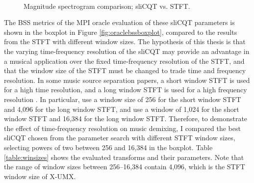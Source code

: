\documentclass[report.tex]{subfiles}
\begin{document}
\begin{figure}[ht]
	\centering
	\\
	\caption{Magnitude spectrogram comparison; sliCQT vs. STFT.}
	\label{fig:bipolarslicqs}
\end{figure}

The BSS metrics of the MPI oracle evaluation of these sliCQT parameters is shown in the boxplot in Figure \ref{fig:oraclebssboxplot}, compared to the results from the STFT with different window sizes. The hypothesis of this thesis is that the varying time-frequency resolution of the sliCQT may provide an advantage in a musical application over the fixed time-frequency resolution of the STFT, and that the window size of the STFT must be changed to trade time and frequency resolution. In some music source separation papers, a short window STFT is used for a high time resolution, and a long window STFT is used for a high frequency resolution \parencite{fitzgerald2, driedger}. In particular, \textcite{driedger} use a window size of 256 for the short window STFT and 4,096 for the long window STFT, and \textcite{fitzgerald2} use a window of 1,024 for the short window STFT and 16,384 for the long window STFT. Therefore, to demonstrate the effect of time-frequency resolution on music demixing, I compared the best sliCQT chosen from the parameter search with different STFT window sizes, selecting powers of two between 256 and 16,384 in the boxplot. Table \ref{table:winsizes} shows the evaluated transforms and their parameters. Note that the range of window sizes between 256--16,384 contain 4,096, which is the STFT window size of X-UMX.
\end{document}
